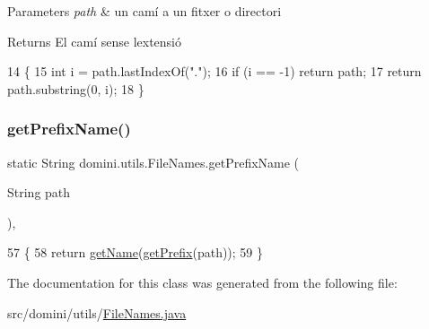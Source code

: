 \begin{DoxyParams}{Parameters}
{\em path} & un camí a un fitxer o directori \\
\hline
\end{DoxyParams}
\begin{DoxyReturn}{Returns}
El camí sense l\textquotesingle{}extensió 
\end{DoxyReturn}

\begin{DoxyCode}
14                                                 \{
15         \textcolor{keywordtype}{int} i = path.lastIndexOf(\textcolor{stringliteral}{"."});
16         \textcolor{keywordflow}{if} (i == -1) \textcolor{keywordflow}{return} path;
17         \textcolor{keywordflow}{return} path.substring(0, i);
18     \}
\end{DoxyCode}
\mbox{\label{classdomini_1_1utils_1_1FileNames_afcfe1e3bb1f49c70807fcd66a21d2b9a}} 
\subsubsection{\texorpdfstring{get\+Prefix\+Name()}{getPrefixName()}}
{\footnotesize\ttfamily static String domini.\+utils.\+File\+Names.\+get\+Prefix\+Name (\begin{DoxyParamCaption}\item[{String}]{path }\end{DoxyParamCaption})\hspace{0.3cm}{\ttfamily [inline]}, {\ttfamily [static]}}


\begin{DoxyCode}
57                                                     \{
58         \textcolor{keywordflow}{return} \hyperlink{classdomini_1_1utils_1_1FileNames_ade42cac265a0eb6d3bbccc671f669253}{getName}(\hyperlink{classdomini_1_1utils_1_1FileNames_a217ed1d50727e5109fdbd626a3b5bf07}{getPrefix}(path));
59     \}
\end{DoxyCode}


The documentation for this class was generated from the following file\+:\begin{DoxyCompactItemize}
\item 
src/domini/utils/\hyperlink{FileNames_8java}{File\+Names.\+java}\end{DoxyCompactItemize}
